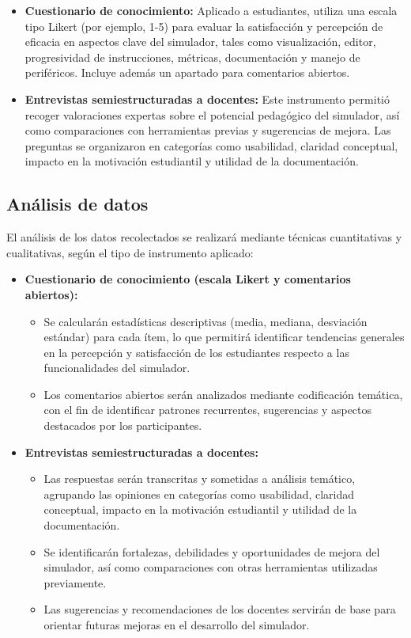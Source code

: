 \documentclass[12pt,oneside]{templates/unerthesis}
\providecommand{\tightlist}{%
  \setlength{\itemsep}{0pt}\setlength{\parskip}{0pt}}
\begin{document}
\begin{itemize}
\item
  \textbf{Cuestionario de conocimiento:} Aplicado a estudiantes, utiliza una escala tipo Likert (por ejemplo, 1-5) para evaluar la satisfacción y percepción de eficacia en aspectos clave del simulador, tales como visualización, editor, progresividad de instrucciones, métricas, documentación y manejo de periféricos. Incluye además un apartado para comentarios abiertos.
\item
  \textbf{Entrevistas semiestructuradas a docentes:} Este instrumento permitió recoger valoraciones expertas sobre el potencial pedagógico del simulador, así como comparaciones con herramientas previas y sugerencias de mejora. Las preguntas se organizaron en categorías como usabilidad, claridad conceptual, impacto en la motivación estudiantil y utilidad de la documentación.
\end{itemize}

\hypertarget{anuxe1lisis-de-datos}{%
\subsection{Análisis de datos}\label{anuxe1lisis-de-datos}}

El análisis de los datos recolectados se realizará mediante técnicas cuantitativas y cualitativas, según el tipo de instrumento aplicado:

\begin{itemize}
\tightlist
\item
  \textbf{Cuestionario de conocimiento (escala Likert y comentarios abiertos):}

  \begin{itemize}
  \tightlist
  \item
    Se calcularán estadísticas descriptivas (media, mediana, desviación estándar) para cada ítem, lo que permitirá identificar tendencias generales en la percepción y satisfacción de los estudiantes respecto a las funcionalidades del simulador.
  \item
    Los comentarios abiertos serán analizados mediante codificación temática, con el fin de identificar patrones recurrentes, sugerencias y aspectos destacados por los participantes.
  \end{itemize}
\item
  \textbf{Entrevistas semiestructuradas a docentes:}

  \begin{itemize}
  \tightlist
  \item
    Las respuestas serán transcritas y sometidas a análisis temático, agrupando las opiniones en categorías como usabilidad, claridad conceptual, impacto en la motivación estudiantil y utilidad de la documentación.
  \item
    Se identificarán fortalezas, debilidades y oportunidades de mejora del simulador, así como comparaciones con otras herramientas utilizadas previamente.
  \item
    Las sugerencias y recomendaciones de los docentes servirán de base para orientar futuras mejoras en el desarrollo del simulador.
  \end{itemize}
\end{itemize}
\end{document}
